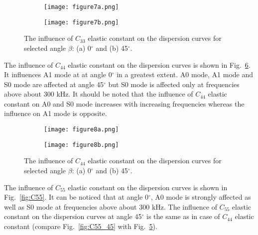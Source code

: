 { \begin{figure} [h!]
 	\centering
 	\begin{subfigure}[b]{0.47\textwidth}
 		\centering
 		\texttt{[image: figure7a.png]}
 		\caption{}
 		\label{fig:C33_0}
 	\end{subfigure}
 	\hfill
 	\begin{subfigure}[b]{0.47\textwidth}
 		\centering
 		\texttt{[image: figure7b.png]}
 		\caption{}
 		\label{fig:C33_45}
 	\end{subfigure}
 	\caption{The influence of \(C_{33}\) elastic constant on the dispersion curves for selected angle \(\beta\): (a) 0\(^{\circ}\) and (b) 45\(^{\circ}\).} 
 	\label{fig:C33}
 \end{figure}
 
 The influence of \(C_{44}\) elastic constant on the dispersion curves is shown in Fig.~\ref{fig:C44}.
 It influences A1 mode at at angle  0\(^{\circ}\) in a greatest extent.
 A0 mode, A1 mode and S0 mode are affected at angle 45\(^{\circ}\) but S0 mode is affected only at frequencies above about 300 kHz.
 It should be noted that the influence of \(C_{44}\) elastic constant on A0 and S0 mode increases with increasing frequencies whereas the influence on A1 mode is opposite.
 
 \begin{figure} [h!]
 	\centering
 	\begin{subfigure}[b]{0.47\textwidth}
 		\centering
 		\texttt{[image: figure8a.png]}
 		\caption{}
 		\label{fig:C44_0}
 	\end{subfigure}
 	\hfill
 	\begin{subfigure}[b]{0.47\textwidth}
 		\centering
 		\texttt{[image: figure8b.png]}
 		\caption{}
 		\label{fig:C44_45}
 	\end{subfigure}
 	\caption{The influence of \(C_{44}\) elastic constant on the dispersion curves for selected angle \(\beta\): (a) 0\(^{\circ}\) and (b) 45\(^{\circ}\).} 
 	\label{fig:C44}
 \end{figure}
 
 The influence of \(C_{55}\) elastic constant on the dispersion curves is shown in Fig.~\ref{fig:C55}.
 It can be noticed that at angle 0\(^{\circ}\), A0 mode is strongly affected as well as S0 mode at frequencies above about 300 kHz.
 The influence of \(C_{55}\) elastic constant on the dispersion curves at angle 45\(^{\circ}\) is the same as in case of  \(C_{44}\) elastic constant (compare Fig.~\ref{fig:C55_45} with Fig.~\ref{fig:C44_45}).
 
}
